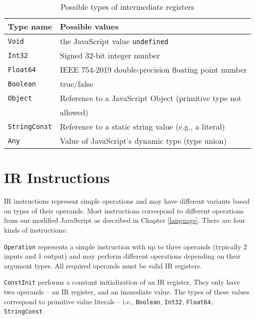 \begin{table}[H]
    \centering
    \begin{tabular}{l | l}
        Type name            & Possible values                                                \\\hline
        \texttt{Void}        & the JavaScript value \texttt{undefined}                        \\
        \texttt{Int32}       & Signed 32-bit integer number                                   \\
        \texttt{Float64}     & IEEE 754-2019 double-precision floating point number           \\
        \texttt{Boolean}     & true/false                                                     \\
        \texttt{Object}      & Reference to a JavaScript Object (primitive type not           \\
                             & allowed)  \\
        \texttt{StringConst} & Reference to a static string value (e.g., a literal)           \\
        \texttt{Any}         & Value of JavaScript's dynamic type (type union)
    \end{tabular}
    \caption{Possible types of intermediate registers}
    \label{tab:types}
\end{table}


\section{IR Instructions}

IR instructions represent simple operations and may have different variants based on types of their operands. Most instructions correspond to different operations from our modified JavaScript as described in Chapter \ref{language}. There are four kinds of instructions:


\texttt{Operation} represents a simple instruction with up to three operands (typically 2 inputs and 1 output) and may perform different operations depending on their argument types. All required operands must be valid IR registers.

\texttt{ConstInit} performs a constant initialization of an IR register. They only have two operands -- an IR register, and an immediate value. The types of these values correspond to primitive value literals -- i.e., \texttt{Boolean}, \texttt{Int32}, \texttt{Float64}, \texttt{StringConst}.

